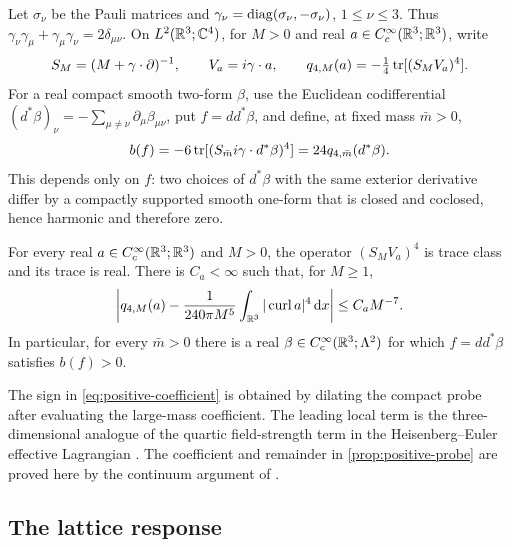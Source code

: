 Let $\sigma_\nu$ be the Pauli matrices and
$\gamma_\nu=\operatorname{diag}(\sigma_\nu,-\sigma_\nu)$, $1\le\nu\le3$.
Thus $\gamma_\nu\gamma_\mu+\gamma_\mu\gamma_\nu=2\delta_{\mu\nu}$.
On $L^2(\mathbb R^3;\mathbb C^4)$, for $M>0$ and real
$a\in C_c^\infty(\mathbb R^3;\mathbb R^3)$, write
\[
 S_M=(M+\gamma\cdot\partial)^{-1},\qquad
 V_a=i\gamma\cdot a,\qquad
 q_{4,M}(a)=-\tfrac14\operatorname{tr}[(S_MV_a)^4].
\]
For a real compact smooth two-form $\beta$, use the Euclidean
codifferential
$(d^*\beta)_\nu=-\sum_{\mu\ne\nu}\partial_\mu\beta_{\mu\nu}$,
put $f=dd^*\beta$, and define, at fixed mass $\bar m>0$,
\begin{equation}\label{eq:positive-coefficient}
 b(f)=-6\operatorname{tr}[(S_{\bar m}i\gamma\cdot d^*\beta)^4]
      =24q_{4,\bar m}(d^*\beta).
\end{equation}
This depends only on $f$: two choices of $d^*\beta$ with the same
exterior derivative differ by a compactly supported smooth one-form
that is closed and coclosed, hence harmonic and therefore zero.
\begin{theorem}\label{prop:positive-probe}
For every real $a\in C_c^\infty(\mathbb R^3;\mathbb R^3)$ and $M>0$,
the operator $(S_MV_a)^4$ is trace class and its trace is real. There
is $C_a<\infty$ such that, for $M\ge1$,
\begin{equation}\label{eq:large-mass-quartic}
 \left|q_{4,M}(a)-\frac1{240\pi M^5}
       \int_{\mathbb R^3}|\operatorname{curl}a|^4\,\mathrm d x\right|
 \le C_aM^{-7}.
\end{equation}
In particular, for every $\bar m>0$ there is a real
$\beta\in C_c^\infty(\mathbb R^3;\Lambda^2)$ for which $f=dd^*\beta$ satisfies
$b(f)>0$.
\end{theorem}


The sign in \eqref{eq:positive-coefficient} is obtained by dilating
the compact probe after evaluating the large-mass coefficient.
The leading local term is the three-dimensional analogue of the
quartic field-strength term in the Heisenberg--Euler effective
Lagrangian \cite{HeisenbergEuler1936}. The coefficient and remainder
in \cref{prop:positive-probe} are proved here by the continuum
argument of \cite[\S17]{QED3Master}.

\subsection{The lattice response}\label{subsec:response-conventions}

